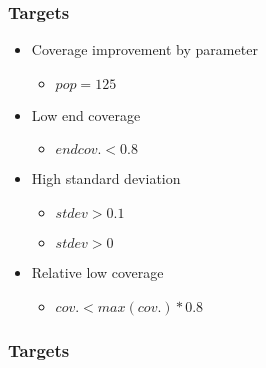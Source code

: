 \begin{frame}
	\frametitle{Targets}
	
	\begin{itemize}
		\item Coverage improvement by parameter
		\begin{itemize}
			\item $pop = 125$
		\end{itemize} 
		\item Low end coverage
		\begin{itemize}
			\item $endcov. < 0.8$
		\end{itemize} 
		\item High standard deviation 
		\begin{itemize}
			\item $stdev > 0.1$
			\item $stdev > 0$
		\end{itemize} 
		\item Relative low coverage 
		\begin{itemize}
			\item $cov. < max(cov.) * 0.8$
		\end{itemize} 
	\end{itemize}
	
\end{frame}

\begin{frame}
	\frametitle{Targets}
	
	\begin{table}
		\centering
		\resizebox{\textwidth}{!}{}
	\end{table}
	
\end{frame}
